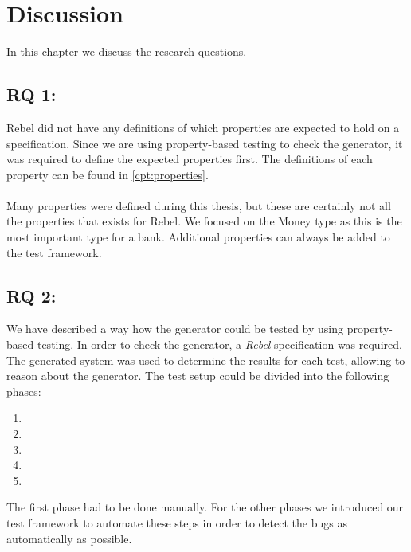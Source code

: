 \chapter{Discussion}
\label{cpt:discussion}
In this chapter we discuss the research questions.

\section{RQ 1: \rqOne{}}
Rebel did not have any definitions of which properties are expected to hold on a
specification. Since we are using property-based testing to check the generator,
it was required to define the expected properties first. The definitions of each
property can be found in \autoref{cpt:properties}.\\
\\
Many properties were defined during this thesis, but these are certainly not all
the properties that exists for Rebel. We focused on the Money type as this is
the most important type for a bank. Additional properties can always be added to
the test framework.

\section{RQ 2: \rqTwo{}}
We have described a way how the generator could be tested by using property-based testing. In order to check the generator, a \textit{Rebel} specification was required. The generated system was used to determine the results for each test, allowing to reason about the generator. The test setup could be divided into the following phases:
\begin{enumerate}
  \item \tfPhaseOne{}
  \item \tfPhaseTwo{}
  \item \tfPhaseThree{}
  \item \tfPhaseFour{}
  \item \tfPhaseFive{}
\end{enumerate}
The first phase had to be done manually. For the other phases we introduced our test framework to automate these steps in order to detect the bugs as automatically as possible.

